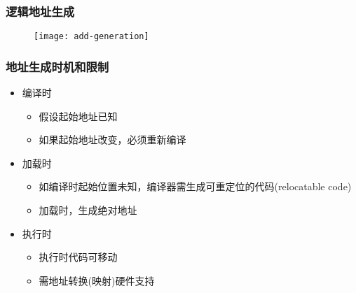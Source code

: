\begin{frame}[plain,t]
    
    \frametitle{逻辑地址生成}
    \begin{figure}
        \centering
        \texttt{[image: add-generation]}
    \end{figure}
    
\end{frame}
\begin{frame}[plain,t]
    \frametitle{地址生成时机和限制}
	\begin{itemize}
	    \item 编译时
	    \begin{itemize}
	        \item 假设起始地址已知
	        \item 如果起始地址改变，必须重新编译
	    \end{itemize}
	    \item 加载时
	    \begin{itemize}
	        \item 如编译时起始位置未知，编译器需生成可重定位的代码(relocatable code) 
	        \item 加载时，生成绝对地址
	    \end{itemize}
	    \item 执行时
	    \begin{itemize}
	        \item 执行时代码可移动
	        \item 需地址转换(映射)硬件支持
	    \end{itemize}
	\end{itemize}    
\end{frame}
